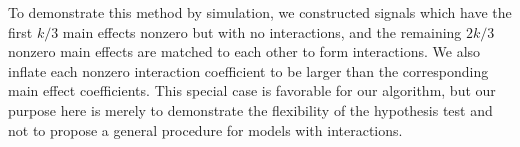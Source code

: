 \documentclass{imsart}
\newcommand{\argmax}{\mathop{\mathrm{argmax}}}
\newcommand{\norm}[1]{\lVert #1 \rVert}
\begin{document}

To demonstrate this method by simulation, we constructed signals which have
the first $k/3$ main effects nonzero but with no interactions, and the
remaining $2k/3$ nonzero main effects are matched to each other to form
interactions.
We also inflate each nonzero interaction
coefficient to be larger than the corresponding main
effect coefficients. This special case is favorable for our algorithm,
but our purpose here is merely to demonstrate the flexibility of the
hypothesis test and not to propose a general procedure for models with
interactions.
\end{document}
